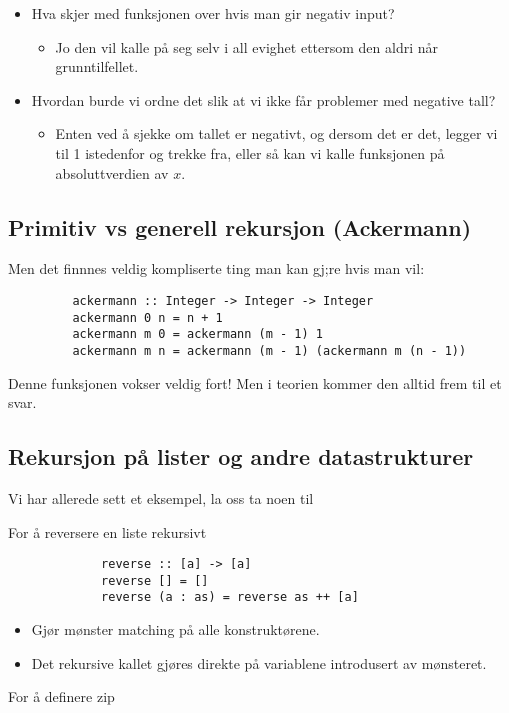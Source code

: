 \documentclass{article}
\begin{document}
     \begin{itemize}
         \item Hva skjer med funksjonen over hvis man gir negativ input?
             \begin{itemize}
                 \item Jo den vil kalle på seg selv i all evighet ettersom den aldri når grunntilfellet.
             \end{itemize}
         \item Hvordan burde vi ordne det slik at vi ikke får problemer med negative tall?
             \begin{itemize}
                 \item Enten ved å sjekke om tallet er negativt, og dersom det er det, legger vi til 1 istedenfor og trekke fra, eller så kan vi kalle funksjonen på absoluttverdien av \( x \).
             \end{itemize}
     \end{itemize}

     \subsection{Primitiv vs generell rekursjon (Ackermann)}

     Men det finnnes veldig kompliserte ting man kan gj;re hvis man vil:

     \begin{lstlisting}
         ackermann :: Integer -> Integer -> Integer
         ackermann 0 n = n + 1
         ackermann m 0 = ackermann (m - 1) 1
         ackermann m n = ackermann (m - 1) (ackermann m (n - 1))
     \end{lstlisting}

     Denne funksjonen vokser veldig fort! Men i teorien kommer den alltid frem til et svar.

     \subsection{Rekursjon på lister og andre datastrukturer}

     Vi har allerede sett et eksempel, la oss ta noen til

     \begin{eg}
         For å reversere en liste rekursivt

         \begin{lstlisting}
             reverse :: [a] -> [a]
             reverse [] = []
             reverse (a : as) = reverse as ++ [a]
         \end{lstlisting}

         \begin{itemize}
             \item Gjør mønster matching på alle konstruktørene.
             \item Det rekursive kallet gjøres direkte på variablene introdusert av mønsteret.
         \end{itemize}
     \end{eg}

     \begin{eg}
         For å definere zip

         \begin{lstlisting}
             
         \end{lstlisting}
     \end{eg}
    
\end{document}
